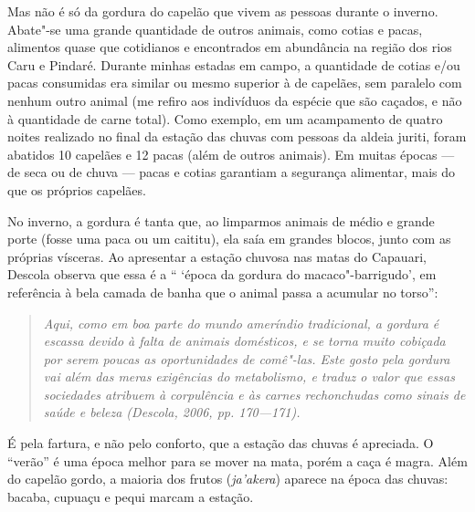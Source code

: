 Mas não é só da gordura do capelão que vivem as pessoas durante o
inverno. Abate"-se uma grande quantidade de outros animais, como cotias e
pacas, alimentos quase que cotidianos e encontrados em abundância na
região dos rios Caru e Pindaré. Durante minhas estadas em campo, a
quantidade de cotias e/ou pacas consumidas era similar ou mesmo superior
à de capelães, sem paralelo com nenhum outro animal (me refiro aos
indivíduos da espécie que são caçados, e não à quantidade de carne
total). Como exemplo, em um acampamento de quatro noites realizado no
final da estação das chuvas com pessoas da aldeia juriti, foram abatidos
10 capelães e 12 pacas (além de outros animais). Em muitas épocas --- de
seca ou de chuva --- pacas e cotias garantiam a segurança alimentar, mais
do que os próprios capelães.

No inverno, a gordura é tanta que, ao limparmos animais de médio e
grande porte (fosse uma paca ou um caititu), ela saía em grandes blocos,
junto com as próprias vísceras. Ao apresentar a estação chuvosa nas
matas do Capauari, Descola observa que essa é a `` `época da gordura do
macaco"-barrigudo', em referência à bela camada de banha que o animal
passa a acumular no torso'':

\begin{quote}
\emph{Aqui, como em boa parte do mundo ameríndio tradicional, a gordura é
escassa devido à falta de animais domésticos, e se torna muito cobiçada
por serem poucas as oportunidades de comê"-las. Este gosto pela gordura
vai além das meras exigências do metabolismo, e traduz o valor que essas
sociedades atribuem à corpulência e às carnes rechonchudas como sinais
de saúde e beleza (Descola, 2006, pp. 170---171).}
\end{quote}

É pela fartura, e não pelo conforto, que a estação das chuvas é
apreciada. O ``verão'' é uma época melhor para se mover na mata, porém a
caça é magra. Além do capelão gordo, a maioria dos frutos
(\emph{ja'akera}) aparece na época das chuvas: bacaba, cupuaçu e pequi
marcam a estação.


